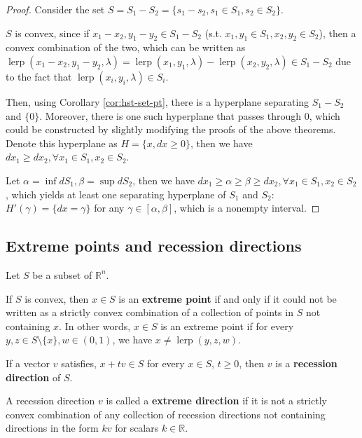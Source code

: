 \begin{proof}
  Consider the set \( S = S_{1} - S_{2} = \{s_{1} - s_{2},
  s_{1} \in S_{1}, s_{2} \in S_{2}\}   \).

  \( S \) is convex, since if \( x_{1}-x_{2}, y_{1}-y_{2} \in S_{1}-S_{2} \)
  (s.t. \( x_{1},y_{1} \in S_{1}, x_{2}, y_{2} \in S_{2} \)), then a convex
  combination of the two, which can be written as \(
  \operatorname{lerp}(x_{1}-x_{2},y_{1}-y_{2},\lambda) =
  \operatorname{lerp}(x_{1},y_{1},\lambda) -
  \operatorname{lerp}(x_{2},y_{2},\lambda) \in S_{1}-S_{2} \) due to the fact
  that \( \operatorname{lerp}(x_{i},y_{i}, \lambda) \in S_{i} \).

  Then, using Corollary \ref{cor:hst-set-pt}, there is a hyperplane separating
  \( S_{1}-S_{2} \) and \( \{0\}   \). Moreover, there is one such hyperplane
  that passes through \( 0 \), which could be constructed by slightly modifying
  the proofs of the above theorems. Denote this hyperplane as \( H = \{x, dx \ge
  0\}   \), then we have \( dx_{1} \ge  dx_{2}, \forall x_{1} \in S_{1}, x_{2}
  \in S_{2} \).

  Let \( \alpha = \inf dS_{1}, \beta = \sup dS_{2} \), then we have \( dx_{1}
  \ge  \alpha \ge  \beta \ge dx_{2}, \forall x_{1} \in S_{1},x_{2} \in S_{2} \),
  which yields at least one separating hyperplane of \( S_{1} \) and \( S_{2}
  \): \( H'(\gamma) = \{ dx = \gamma\}   \) for any \( \gamma \in [\alpha,\beta]
  \), which is a nonempty interval.
\end{proof}


\subsection{Extreme points and recession directions} %
\label{sub:Extreme points and recession directions}

\begin{definition}
  Let \( S \) be a subset of \( \mathbb{R}^{n} \).

  If \( S \) is convex, then \( x \in S \) is an \textbf{extreme point} if and only if
  it could not be written as a strictly convex combination of a collection
  of points in
  \( S \) not containing \( x \). In other words, \( x \in S \) is an extreme
  point if for every \( y, z \in S \setminus \{x\}, w \in (0, 1)   \), we have
  \( x \neq \operatorname{lerp}(y,z,w) \).

  If a vector \( v \) satisfies, \( x + tv \in S \) for every \( x \in S \), \(
  t \ge  0\), then \( v \) is a \textbf{recession direction} of \( S \).

  A recession direction \( v \) is called a \textbf{extreme direction} if it is
  not a strictly convex combination of any collection of recession directions
  not containing directions in the form \( kv \) for scalars \( k \in \mathbb{R}
  \).
\end{definition}

